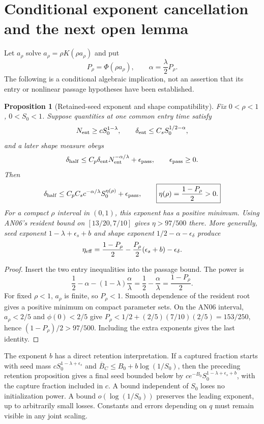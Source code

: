 \documentclass[11pt]{article}
\numberwithin{equation}{section}
\newtheorem{proposition}[theorem]{Proposition}
\theoremstyle{remark}\newtheorem{remark}[theorem]{Remark}
\begin{document}
\section{Conditional exponent cancellation and the next open lemma}
\label{inc:LPR:v1:exponents}
Let $a_\rho$ solve $a_\rho=\rho K(\rho a_\rho)$ and put
\[
 P_\rho=\Phi(\rho a_\rho),\qquad
 \alpha=\frac\lambda2P_\rho.
\]
The following is a conditional algebraic implication, not an assertion
that its entry or nonlinear passage hypotheses have been established.

\begin{proposition}[Retained-seed exponent and shape compatibility]
\label{inc:LPR:v1:exponenttheorem}
Fix $0<\rho<1$, $0<S_0<1$. Suppose quantities at one common entry time
satisfy
\[
 N_{\rm ent}\ge c S_0^{1-\lambda},\qquad
 \delta_{\rm ent}\le C_s S_0^{1/2-\alpha},
\]
and a later shape measure obeys
\[
 \delta_{\rm half}\le C_p\delta_{\rm ent}
               N_{\rm ent}^{-\alpha/\lambda}+\epsilon_{\rm pass},
 \qquad \epsilon_{\rm pass}\ge0.
\]
Then
\[
 \delta_{\rm half}\le C_pC_s c^{-\alpha/\lambda}
                 S_0^{\eta(\rho)}+\epsilon_{\rm pass},\qquad
 \boxed{\eta(\rho)=\frac{1-P_\rho}{2}>0.}
\]
For a compact $\rho$ interval in $(0,1)$, this exponent has a positive
minimum. Using AN06's resident bound on $[13/20,7/10]$ gives
$\eta>97/500$ there.
More generally, seed exponent $1-\lambda+\epsilon_s+b$ and shape exponent
$1/2-\alpha-\epsilon_\delta$ produce
\[
 \eta_{\rm eff}=\frac{1-P_\rho}{2}
               -\frac{P_\rho}{2}(\epsilon_s+b)-\epsilon_\delta.
\]
\end{proposition}
\begin{proof}
Insert the two entry inequalities into the passage bound. The power is
\[
 \frac12-\alpha-(1-\lambda)\frac\alpha\lambda
 =\frac12-\frac\alpha\lambda=\frac{1-P_\rho}{2}.
\]
For fixed $\rho<1$, $a_\rho$ is finite, so $P_\rho<1$. Smooth dependence
of the resident root gives a positive minimum on compact parameter sets.
On the AN06 interval, $a_\rho<2/5$ and $\phi(0)<2/5$ give
$P_\rho<1/2+(2/5)(7/10)(2/5)=153/250$, hence
$(1-P_\rho)/2>97/500$. Including the extra exponents gives the last
identity.
\end{proof}

The exponent $b$ has a direct retention interpretation. If a captured
fraction starts with seed mass $cS_0^{1-\lambda+\epsilon_s}$ and
$\overline B_C\le B_0+b\log(1/S_0)$, then the preceding retention
proposition gives a final seed bounded below by
$c e^{-B_0}S_0^{1-\lambda+\epsilon_s+b}$, with the capture fraction
included in $c$. A bound independent of $S_0$ loses no initialization
power. A bound $o(\log(1/S_0))$ preserves the leading exponent, up to
arbitrarily small losses. Constants and errors depending on $q$ must
remain visible in any joint scaling.
\end{document}
